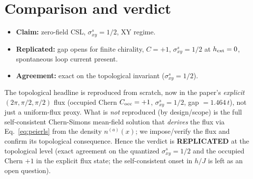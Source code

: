 \documentclass[aps,prb,twocolumn,superscriptaddress,nofootinbib]{revtex4-2}
\begin{document}
\section{Comparison and verdict}
\begin{itemize}
\item \textbf{Claim:} zero-field CSL, $\sigma^s_{xy}=1/2$, XY regime.
\item \textbf{Replicated:} gap opens for finite chirality, $C=+1$,
$\sigma^s_{xy}=1/2$ at $h_{\rm ext}=0$, spontaneous loop current present.
\item \textbf{Agreement:} exact on the topological invariant
($\sigma^s_{xy}=1/2$).
\end{itemize}
The topological headline is reproduced from scratch, now in the paper's
\emph{explicit} $(2\pi,\pi/2,\pi/2)$ flux (occupied Chern $C_{\rm occ}=+1$,
$\sigma^s_{xy}=1/2$, gap $=1.464\,t$), not just a uniform-flux proxy. What is
\emph{not} reproduced (by design/scope) is the full self-consistent
Chern-Simons mean-field solution that \emph{derives} the flux via
Eq.~\eqref{eq:peierls} from the density $n^{(a)}(x)$; we impose/verify the flux
and confirm its topological consequence. Hence the verdict is
\textbf{REPLICATED} at the topological level (exact agreement on the quantized
$\sigma^s_{xy}=1/2$ and the occupied Chern $+1$ in the explicit flux state; the
self-consistent onset in $h/J$ is left as an open question).
\end{document}
